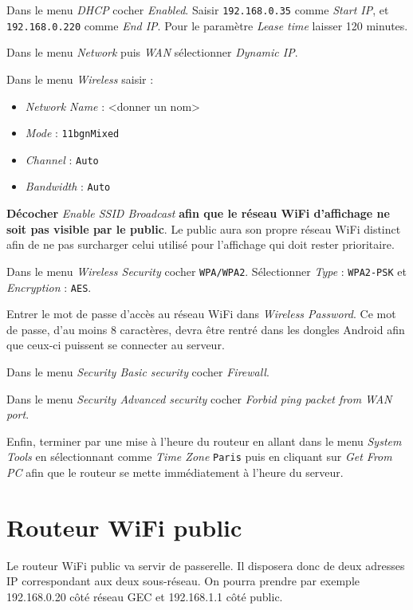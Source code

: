 \documentclass[a4paper]{ffco-rapport}
\begin{document}
	Dans le menu \emph{DHCP} cocher \emph{Enabled}. Saisir \texttt{192.168.0.35} comme \emph{Start IP}, et \texttt{192.168.0.220} comme \emph{End IP}.
	Pour le paramètre \emph{Lease time} laisser 120 minutes.
	
	Dans le menu \emph{Network} puis \emph{WAN} sélectionner \emph{Dynamic IP}.
	
	Dans le menu \emph{Wireless} saisir :
		
	\begin{itemize}
		\item \emph{Network Name} : <donner un nom>
		\item \emph{Mode} : \texttt{11bgnMixed}
		\item \emph{Channel} : \texttt{Auto}
		\item \emph{Bandwidth} : \texttt{Auto}
	\end{itemize}
	
	\textbf{Décocher} \emph{Enable SSID Broadcast} \textbf{afin que le réseau WiFi d'affichage ne soit pas visible par le public}.
	Le public aura son propre réseau WiFi distinct afin de ne pas surcharger celui utilisé pour l'affichage qui doit rester prioritaire.
	
	Dans le menu \emph{Wireless Security} cocher \texttt{WPA/WPA2}. Sélectionner \emph{Type} : \texttt{WPA2-PSK} et \emph{Encryption} : \texttt{AES}.
	
	Entrer le mot de passe d'accès au réseau WiFi dans \emph{Wireless Password}.
	Ce mot de passe, d'au moins 8 caractères, devra être rentré dans les dongles Android afin que ceux-ci puissent se connecter au serveur.
	
	Dans le menu \emph{Security Basic security} cocher \emph{Firewall}.
	
	Dans le menu \emph{Security Advanced security} cocher \emph{Forbid ping packet from WAN port}.
	
	Enfin, terminer par une mise à l'heure du routeur en allant dans le menu \emph{System Tools} en sélectionnant comme \emph{Time Zone} \texttt{Paris} puis en cliquant sur \emph{Get From PC} afin que le routeur se mette immédiatement à l'heure du serveur.
	

\chapter{Routeur WiFi public}
	Le routeur WiFi public va servir de passerelle. Il disposera donc de deux adresses IP correspondant aux deux sous-réseau. On pourra prendre par exemple 192.168.0.20 côté réseau GEC et 192.168.1.1 côté public.
	
\end{document}
